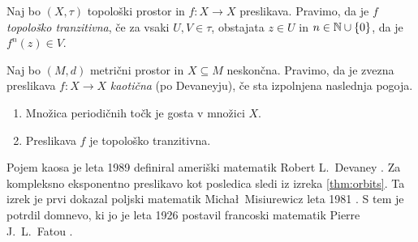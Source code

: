 \begin{definicija}
    Naj bo \((X, \tau)\) topološki prostor in \(f \colon X \to X\) preslikava. Pravimo, da je \(f\) \emph{topološko tranzitivna}, če za vsaki \(U, V \in \tau\), obstajata \(z \in U\) in
    \(n \in \mathbb N \cup \left\{ 0 \right\}\), da je \(f^n (z) \in V\).
\end{definicija}

\begin{definicija}
    Naj bo \((M, d)\) metrični prostor in \(X \subseteq M\) neskončna. Pravimo, da je zvezna preslikava \(f \colon X \to X\) \emph{kaotična} (po Devaneyju), če sta izpolnjena naslednja pogoja.
    \begin{enumerate}
        \item Množica periodičnih točk je gosta v množici \(X\).
        \item Preslikava \(f\) je topološko tranzitivna.
    \end{enumerate}
\end{definicija}

\noindent Pojem kaosa je leta \num{1989} definiral ameriški matematik Robert L.~Devaney \cite{Devaney_1986}. Za kompleksno eksponentno preslikavo kot posledica sledi iz izreka 
\ref{thm:orbits}. Ta izrek je prvi dokazal poljski matematik Micha\l\ Misiurewicz leta \num{1981} \cite{Misiurewicz_1981}. S tem je potrdil domnevo, ki jo je leta \num{1926} postavil francoski matematik Pierre J.~L.~Fatou \cite{Fatou_1926}.